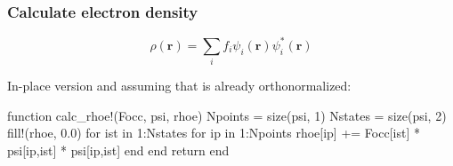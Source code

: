 \begin{frame}[fragile]
\frametitle{Calculate electron density}
    
\begin{equation*}
\rho(\mathbf{r}) = \sum_{i} f_{i} \psi_{i}(\mathbf{r}) \psi^{*}_{i}(\mathbf{r}) 
\end{equation*}
    
In-place version and assuming that  is already orthonormalized:
\begin{juliacode}
function calc_rhoe!(Focc, psi, rhoe)
    Npoints = size(psi, 1)
    Nstates = size(psi, 2)
    fill!(rhoe, 0.0)
    for ist in 1:Nstates
        for ip in 1:Npoints
            rhoe[ip] += Focc[ist] * psi[ip,ist] * psi[ip,ist]
        end
    end
    return
end
\end{juliacode}
    
\end{frame}







